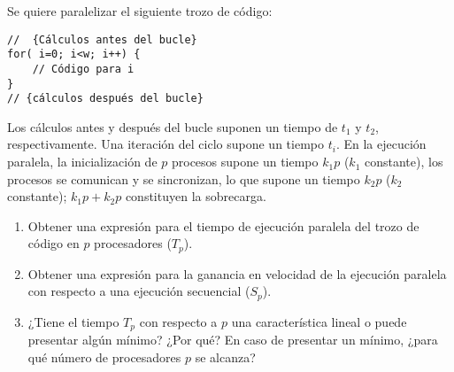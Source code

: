 \begin{ejercicio}
    Se quiere paralelizar el siguiente trozo de código:
    \begin{verbatim}
//  {Cálculos antes del bucle}
for( i=0; i<w; i++) {
    // Código para i
}
// {cálculos después del bucle}
    \end{verbatim}
    Los cálculos antes y después del bucle suponen un tiempo de $t_1$ y $t_2$, respectivamente.
    Una iteración del ciclo supone un tiempo $t_i$. En la ejecución paralela, la inicialización de $p$ procesos supone un tiempo
    $k_1p$ ($k_1$ constante), los procesos se comunican y se sincronizan, lo que supone un tiempo $k_2p$ ($k_2$ constante); $k_1p+k_2p$
    constituyen la sobrecarga.
    \begin{enumerate}
        \item Obtener una expresión para el tiempo de ejecución paralela del trozo de código en $p$ procesadores ($T_p$).
        \item Obtener una expresión para la ganancia en velocidad de la ejecución paralela con respecto a una ejecución secuencial ($S_p$).
        \item ¿Tiene el tiempo $T_p$ con respecto a $p$ una característica lineal o puede presentar algún mínimo? ¿Por qué? En caso de presentar un mínimo, ¿para qué número de procesadores $p$ se alcanza?
    \end{enumerate}
\end{ejercicio}

